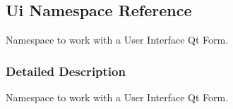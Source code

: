 \hypertarget{a00027}{}\subsection{Ui Namespace Reference}
\label{a00027}


Namespace to work with a User Interface Qt Form.  




\subsubsection{Detailed Description}
Namespace to work with a User Interface Qt Form. 